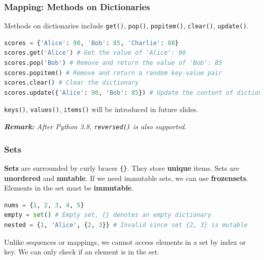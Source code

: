 \documentclass[beamer, en, version=2.0]{huangfusl-template}
\begin{document}
    \begin{frame}[fragile]
        \frametitle{Mapping: Methods on Dictionaries}

        Methods on dictionaries include {\footnotesize\verb|get()|}, {\footnotesize\verb|pop()|}, {\footnotesize\verb|popitem()|}, {\footnotesize\verb|clear()|}, {\footnotesize\verb|update()|}.

\begin{lstlisting}[language=python]
scores = {'Alice': 90, 'Bob': 85, 'Charlie': 88}
scores.get('Alice') # Get the value of 'Alice': 90
scores.pop('Bob') # Remove and return the value of 'Bob': 85
scores.popitem() # Remove and return a random key-value pair
scores.clear() # Clear the dictionary
scores.update({'Alice': 90, 'Bob': 85}) # Update the content of dictionary
\end{lstlisting}

        {\footnotesize\verb|keys()|}, {\footnotesize\verb|values()|}, {\footnotesize\verb|items()|} will be introduced in future slides.

        {\footnotesize\itshape\textbf{Remark:} After Python 3.8, {\scriptsize\verb|reversed()|} is also supported.}
    \end{frame}
    \begin{frame}[fragile]
        \frametitle{Sets}

        \textbf{Sets} are surrounded by curly braces {\footnotesize\verb|{}|}. They store \textbf{unique} items. Sets are \textbf{unordered} and \textbf{mutable}. If we need immutable sets, we can use \textbf{frozensets}. Elements in the set must be \textbf{immutable}.

\begin{lstlisting}[language=python]
nums = {1, 2, 3, 4, 5}
empty = set() # Empty set, {} denotes an empty dictionary
nested = {1, 'Alice', {2, 3}} # Invalid since set {2, 3} is mutable
\end{lstlisting}

        Unlike sequences or mappings, we cannot access elements in a set by index or key. We can only check if an element is in the set.
    \end{frame}
\end{document}
